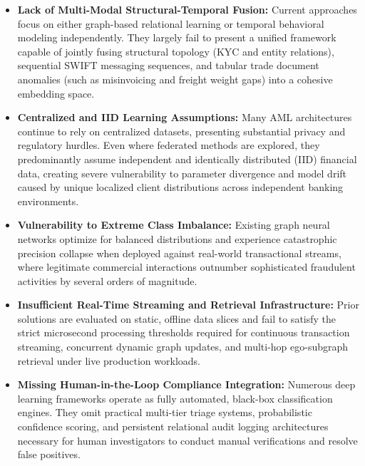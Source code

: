 \documentclass[conference]{IEEEtran}
\begin{document}
\begin{itemize}

\item \textbf{Lack of Multi-Modal Structural-Temporal Fusion:}
Current approaches focus on either graph-based relational learning or temporal behavioral modeling independently. They largely fail to present a unified framework capable of jointly fusing structural topology (KYC and entity relations), sequential SWIFT messaging sequences, and tabular trade document anomalies (such as misinvoicing and freight weight gaps) into a cohesive embedding space.

\item \textbf{Centralized and IID Learning Assumptions:}
Many AML architectures continue to rely on centralized datasets, presenting substantial privacy and regulatory hurdles. Even where federated methods are explored, they predominantly assume independent and identically distributed (IID) financial data, creating severe vulnerability to parameter divergence and model drift caused by unique localized client distributions across independent banking environments.

\item \textbf{Vulnerability to Extreme Class Imbalance:}
Existing graph neural networks optimize for balanced distributions and experience catastrophic precision collapse when deployed against real-world transactional streams, where legitimate commercial interactions outnumber sophisticated fraudulent activities by several orders of magnitude.

\item \textbf{Insufficient Real-Time Streaming and Retrieval Infrastructure:}
Prior solutions are evaluated on static, offline data slices and fail to satisfy the strict microsecond processing thresholds required for continuous transaction streaming, concurrent dynamic graph updates, and multi-hop ego-subgraph retrieval under live production workloads.

\item \textbf{Missing Human-in-the-Loop Compliance Integration:}
Numerous deep learning frameworks operate as fully automated, black-box classification engines. They omit practical multi-tier triage systems, probabilistic confidence scoring, and persistent relational audit logging architectures necessary for human investigators to conduct manual verifications and resolve false positives.

\end{itemize}
\end{document}
